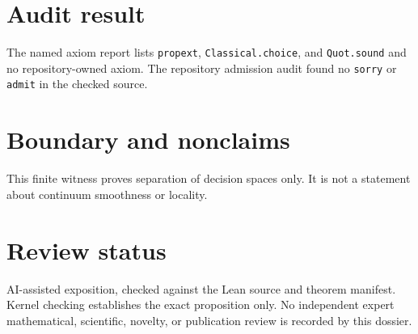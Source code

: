 \documentclass[11pt]{article}
\begin{document}
\section{Audit result}
The named axiom report lists \texttt{propext}, \texttt{Classical.choice}, and
\texttt{Quot.sound} and no repository-owned axiom.  The repository admission audit found no
\texttt{sorry} or \texttt{admit} in the checked source.

\section{Boundary and nonclaims}
This finite witness proves separation of decision spaces only.  It is not a statement about continuum smoothness or locality.

\section{Review status}
AI-assisted exposition, checked against the Lean source and theorem manifest.  Kernel checking
establishes the exact proposition only.  No independent expert mathematical, scientific,
novelty, or publication review is recorded by this dossier.
\end{document}
